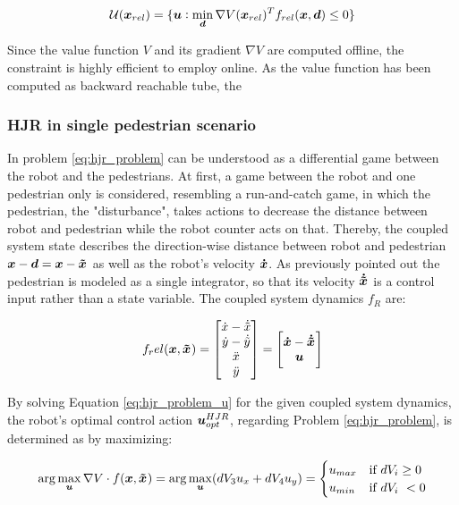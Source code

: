 \begin{equation}
\mathcal{U} (\boldsymbol{x}_{rel}) = \{ \boldsymbol{u}: \min_{\boldsymbol{d}} \nabla V (\boldsymbol{x}_{rel})^T f_{rel}(\boldsymbol{x}, \boldsymbol{d}) \leq 0 \}
\end{equation}

Since the value function $V$ and its gradient $\nabla V$ are computed offline, the constraint is highly efficient to employ online. As the value function has been computed as backward reachable tube, the 

\subsubsection{\ac{HJR} in single pedestrian scenario}
In \project problem \ref{eq:hjr_problem} can be understood as a differential game between the robot and the pedestrians. At first, a game between the robot and one pedestrian only is considered, resembling a run-and-catch game, in which the pedestrian, the "disturbance", takes actions to decrease the distance between robot and pedestrian while the robot counter acts on that. Thereby, the coupled system state describes the direction-wise distance between robot and pedestrian $\x - \boldsymbol{d} = \x - \xped[]$ as well as the robot's velocity $\boldsymbol{\dot{x}}$. As previously pointed out the pedestrian is modeled as a single integrator, so that its velocity $\dxped[]$ is a control input rather than a state variable. The coupled system dynamics $f_R$ are: 

\begin{equation}
f_rel(\x, \xped[]) = 
\begin{bmatrix} 
\dot{x} - \dot{\tilde{x}} \\  
\dot{y} - \dot{\tilde{y}} \\  
\ddot{x} \\
\ddot{y} 
\end{bmatrix} = 
\begin{bmatrix} 
\dx - \dxped[] \\ 
\u
\end{bmatrix}
\label{eq:hj_dynamics}
\end{equation}

By solving Equation \ref{eq:hjr_problem_u} for the given coupled system dynamics, the robot's optimal control action $\boldsymbol{u}_{opt}^{HJR}$, regarding Problem \ref{eq:hjr_problem}, is determined as by maximizing:

\begin{equation}
\arg \max_{\u} \nabla V \cdot f(\x, \xped[]) = \arg \max_{\u} (dV_3 u_x + dV_4 u_y) = 
\begin{cases}
u_{max} & \text{if } dV_i \geq 0 \\
u_{min} & \text{if } dV_i < 0	
\end{cases}
\label{eq:hj_u_opt}
\end{equation}

